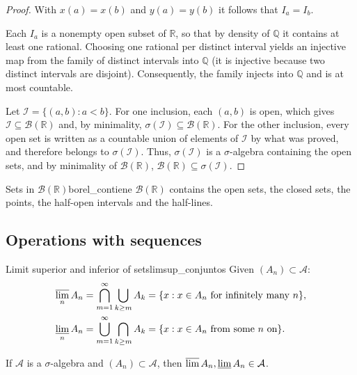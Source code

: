 \documentclass[11pt, a4paper]{article}
\begin{document}
\begin{proof}
With $x(a) = x(b)$ and $y(a) = y(b)$ it follows that $I_a = I_b$.

Each $I_a$ is a nonempty open subset of $\mathbb{R}$, so that by
density of $\mathbb{Q}$ it contains at least one rational. Choosing one rational per distinct
interval yields an injective map from the family of distinct intervals into
$\mathbb{Q}$ (it is injective because two distinct intervals are disjoint). Consequently, the
family injects into $\mathbb{Q}$ and is at most countable.

Let $\mathcal{I} = \{(a, b)
: a < b\}$. For one inclusion, each $(a, b)$ is open, which gives $\mathcal{I} \subseteq
\mathcal{B}(\mathbb{R})$ and, by minimality, $\sigma(\mathcal{I}) \subseteq
\mathcal{B}(\mathbb{R})$.
For the other inclusion, every open set is written as a countable union of elements of
$\mathcal{I}$ by what was proved, and therefore belongs to $\sigma(\mathcal{I})$. Thus,
$\sigma(\mathcal{I})$ is a $\sigma$-algebra containing the open sets, and by minimality of
$\mathcal{B}(\mathbb{R})$, $\mathcal{B}(\mathbb{R}) \subseteq \sigma(\mathcal{I})$.
\end{proof}

\begin{corolario}{Sets in $\mathcal{B}(\mathbb{R})$}{borel_contiene}
$\mathcal{B}(\mathbb{R})$ contains the open sets, the closed sets, the points, the half-open
intervals and the half-lines.
\end{corolario}
 
\subsection{Operations with sequences}

\begin{definicion}{Limit superior and inferior of sets}{limsup_conjuntos}
Given $(A_n) \subset \mathcal{A}$:
\begin{align*}
\varlimsup_n A_n &= \bigcap_{m=1}^\infty \bigcup_{k \ge m} A_k = \{x : x \in A_n \text{ for
infinitely many } n\}, \\
\varliminf_n A_n &= \bigcup_{m=1}^\infty \bigcap_{k \ge m} A_k = \{x : x \in A_n \text{ from
some } n \text{ on}\}.
\end{align*}
\end{definicion}

\obs If $\mathcal{A}$ is a $\sigma$-algebra and $(A_n) \subset \mathcal{A}$, then
$\varlimsup A_n, \varliminf A_n \in \mathcal{A}$.
\end{document}
